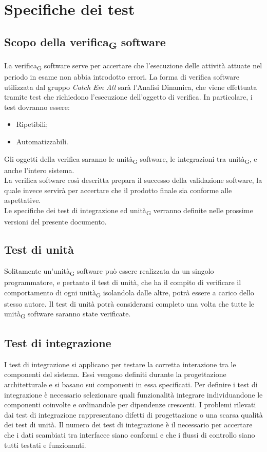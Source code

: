 \section{Specifiche dei test}

\subsection{Scopo della verifica\textsubscript{G} software}
La verifica\textsubscript{G} software serve per accertare che l'esecuzione delle attività attuate nel periodo in esame non abbia introdotto errori. La forma di verifica software utilizzata dal gruppo \textit{Catch Em All} sarà l'Analisi Dinamica, che viene effettuata tramite test che richiedono l'esecuzione dell'oggetto di verifica. In particolare, i test dovranno essere:
\begin{itemize}
	\item Ripetibili;
	\item Automatizzabili.
\end{itemize}
Gli oggetti della verifica saranno le unità\textsubscript{G} software, le integrazioni tra unità\textsubscript{G}, e anche l'intero sistema.\\
La verifica software così descritta prepara il successo della validazione software, la quale invece servirà per accertare che il prodotto finale sia conforme alle aspettative.\\
Le specifiche dei test di integrazione ed unità\textsubscript{G} verranno definite nelle prossime versioni del presente documento.
\subsection{Test di unità}
Solitamente un'unità\textsubscript{G} software può essere realizzata da un singolo programmatore, e pertanto il test di unità, che ha il compito di verificare il comportamento di ogni unità\textsubscript{G} isolandola dalle altre, potrà essere a carico dello stesso autore. Il test di unità potrà considerarsi completo una volta che tutte le unità\textsubscript{G} software saranno state verificate.

\subsection{Test di integrazione}
I test di integrazione si applicano per testare la corretta interazione tra le componenti del sistema. Essi vengono definiti durante la progettazione architetturale e si basano sui componenti in essa specificati.
Per definire i test di integrazione è necessario selezionare quali funzionalità integrare individuandone le componenti coinvolte e ordinandole per dipendenze crescenti.
I problemi rilevati dai test di integrazione rappresentano difetti di progettazione o una scarsa qualità dei test di unità. Il numero dei test di integrazione è il necessario per accertare che i dati scambiati tra interfacce siano conformi e che i flussi di controllo siano tutti testati e funzionanti.

